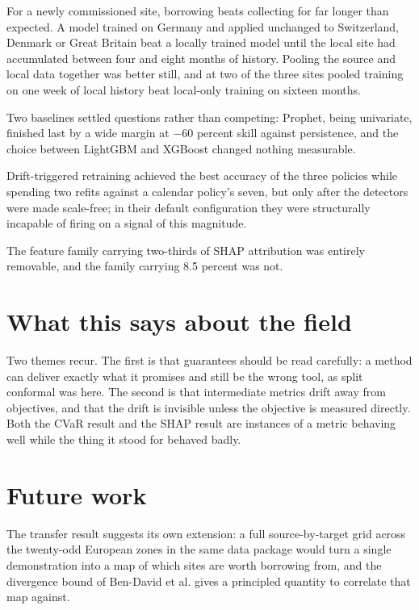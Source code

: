 \documentclass[11pt,a4paper,oneside]{report}
\begin{document}
For a newly commissioned site, borrowing beats collecting for far longer than expected. A model trained on Germany and applied unchanged to Switzerland, Denmark or Great Britain beat a locally trained model until the local site had accumulated between four and eight months of history. Pooling the source and local data together was better still, and at two of the three sites pooled training on one week of local history beat local-only training on sixteen months.

Two baselines settled questions rather than competing: Prophet, being univariate, finished last by a wide margin at $-$60 percent skill against persistence, and the choice between LightGBM and XGBoost changed nothing measurable.

Drift-triggered retraining achieved the best accuracy of the three policies while spending two refits against a calendar policy's seven, but only after the detectors were made scale-free; in their default configuration they were structurally incapable of firing on a signal of this magnitude.

The feature family carrying two-thirds of SHAP attribution was entirely removable, and the family carrying 8.5 percent was not.

\section{What this says about the field}

Two themes recur. The first is that guarantees should be read carefully: a method can deliver exactly what it promises and still be the wrong tool, as split conformal was here. The second is that intermediate metrics drift away from objectives, and that the drift is invisible unless the objective is measured directly. Both the CVaR result and the SHAP result are instances of a metric behaving well while the thing it stood for behaved badly.

\section{Future work}

The transfer result suggests its own extension: a full source-by-target grid across the twenty-odd European zones in the same data package would turn a single demonstration into a map of which sites are worth borrowing from, and the divergence bound of Ben-David et al. gives a principled quantity to correlate that map against.
\end{document}
